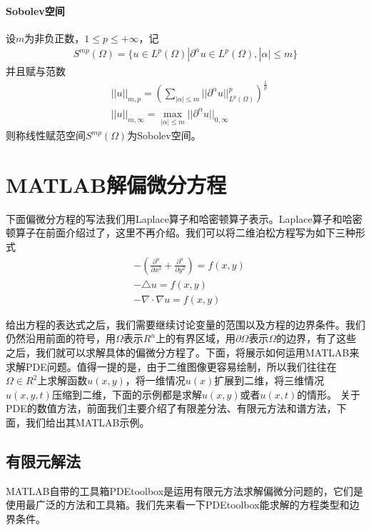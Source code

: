         \paragraph{Sobolev空间}
        设$m$为非负正数，$1 \leqslant p \leqslant +\infty$，记
        \begin{align*}
            S^{mp}(\Omega) = \{u\in L^p(\Omega) |  \partial^{\alpha} u \in L^p(\Omega) ,|\alpha| \leq m \}
        \end{align*}
        并且赋与范数
        \begin{align*}
            &||u||_{m,p} = \left( \sum_{|\alpha| \leq m } ||\partial^{\alpha} u ||_{L^p(\Omega)}^p \right)^{\frac{1}{p}}\\
            &||u||_{m,\infty} = \max_{|\alpha| \leq m } ||\partial^{\alpha} u ||_{0,\infty}
        \end{align*}
        则称线性赋范空间$S^{mp}(\Omega)$为Sobolev空间。

\section{MATLAB解偏微分方程}
    \par
    下面偏微分方程的写法我们用Laplace算子和哈密顿算子表示。Laplace算子和哈密顿算子在前面介绍过了，这里不再介绍。我们可以将二维泊松方程写为如下三种形式
    \begin{align*}
        &- \left( \frac{\partial ^u}{\partial x^2} +\frac{\partial ^u}{\partial y^2} \right) = f(x,y)\\
        &- \triangle u = f(x,y)\\
        &- \nabla\cdot \nabla u = f(x,y)
    \end{align*}
    \par
    给出方程的表达式之后，我们需要继续讨论变量的范围以及方程的边界条件。我们仍然沿用前面的符号，用$\Omega$表示$R^n$上的有界区域，用$\partial \Omega$表示$\Omega$的边界，有了这些之后，我们就可以求解具体的偏微分方程了。下面，将展示如何运用MATLAB来求解PDE问题。值得一提的是，由于二维图像更容易绘制，所以我们往往在$\Omega \in R^2$上求解函数$u(x,y)$，将一维情况$u(x)$扩展到二维，将三维情况$u(x,y,t)$压缩到二维，下面的示例都是求解$u(x,y)$或者$u(x,t)$的情形。
    关于PDE的数值方法，前面我们主要介绍了有限差分法、有限元方法和谱方法，下面，我们给出其MATLAB示例。

    \subsection{有限元解法}
        \par
        MATLAB自带的工具箱PDEtoolbox是运用有限元方法求解偏微分问题的，它们是使用最广泛的方法和工具箱。我们先来看一下PDEtoolbox能求解的方程类型和边界条件。
